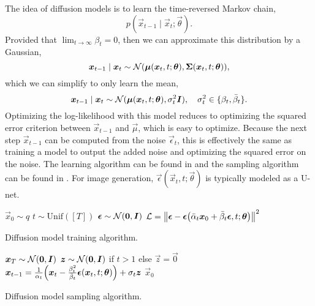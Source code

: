 The idea of diffusion models is to learn the time-reversed Markov chain, \[
    p(\vec{x}_{t-1} \mid \vec{x}_t; \vec{\theta}).
\]
Provided that $\lim_{t\to \infty} \beta_t = 0$, then we can approximate this distribution by a
Gaussian, \[
    \bm{x}_{t-1} \mid \bm{x}_t \sim \mathcal{N}(\bm{\mu}(\bm{x}_t, t; \bm{\theta}), \bm{\Sigma}(\bm{x}_t, t; \bm{\theta})),
\]
which we can simplify to only learn the mean, \[
    \bm{x}_{t-1} \mid \bm{x}_t \sim \mathcal{N}(\bm{\mu}(\bm{x}_t, t; \bm{\theta}), \sigma_t^2 \bm{I}), \quad \sigma_t^2 \in \{ \beta_t, \bar{\beta}_t \}.
\]
Optimizing the log-likelihood with this model reduces to optimizing the squared error criterion
between $\vec{x}_{t-1}$ and $\vec{\mu}$, which is easy to optimize. Because the next step
$\vec{x}_{t-1}$ can be computed from the noise $\vec{\epsilon}_t$, this is effectively the same as
training a model to output the added noise and optimizing \wrt the squared error on the noise. The
learning algorithm can be found in  and the sampling algorithm can be found
in . For image generation, $\vec{\epsilon}(\vec{x}_t, t; \vec{\theta})$ is
typically modeled as a U-net.

\begin{algorithm}[t]
    \begin{algorithmic}[1]
        \State $\vec{x}_0 \sim q$
        \State $t \sim \mathrm{Unif}([T])$
        \State $\bm{\epsilon} \sim \mathcal{N}(\bm{0}, \bm{I})$
        \State $\mathcal{L} = \lft\| \vec{\epsilon} - \vec{\epsilon}\lft( \bar{\alpha}_t \vec{x}_0 + \bar{\beta}_t \vec{\epsilon}, t; \vec{\theta} \rgt) \rgt\|^2$
        \EndWhile
    \end{algorithmic}
    \label{alg:dm-training}
    \caption{Diffusion model training algorithm.}
\end{algorithm}

\begin{algorithm}[t]
    \begin{algorithmic}[1]
        \State $\bm{x}_T \sim \mathcal{N}(\bm{0}, \bm{I})$
        \State $\bm{z} \sim \mathcal{N}(\bm{0}, \bm{I})$ if $t > 1$ else $\vec{z} = \vec{0}$
        \State $\vec{x}_{t-1} = \frac{1}{\alpha_t} \lft( \vec{x}_t - \frac{\beta_t^2}{\bar{\beta}_t} \vec{\epsilon}(\vec{x}_t, t; \vec{\theta}) \rgt) + \sigma_t \vec{z}$
        \EndFor
        \State \Return $\vec{x}_0$
    \end{algorithmic}
    \label{alg:dm-sampling}
    \caption{Diffusion model sampling algorithm.}
\end{algorithm}
